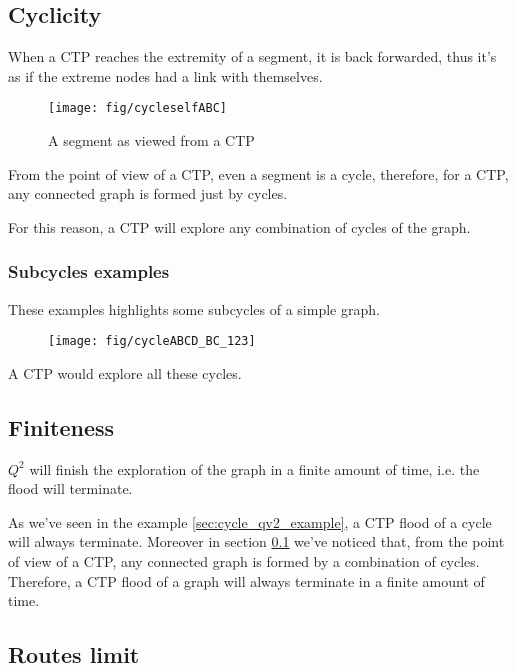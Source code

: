 \documentclass[a4paper]{article}
\begin{document}
\newpage
\subsection{Cyclicity}
\label{sec:CTP_ciclicity}
When a CTP reaches the extremity of a segment, it is back forwarded, thus it's
as if the extreme nodes had a link with themselves.

\begin{figure}[h]
	\begin{center}
		\texttt{[image: fig/cycleselfABC]}
	\end{center}
	\caption{A segment as viewed from a CTP}
	\label{fig:CTP_segment}
\end{figure}

From the point of view of a CTP, even a segment is a cycle, therefore, for a
CTP, any connected graph is formed just by cycles.

For this reason, a CTP will explore any combination of cycles of the graph.

\subsubsection{Subcycles examples}
These examples highlights some subcycles of a simple graph.

\begin{figure}[h]
	\begin{center}
		\texttt{[image: fig/cycleABCD\_BC\_123]}
	\end{center}
\end{figure}
A CTP would explore all these cycles.

\subsection{Finiteness}
$Q^2$ will finish the exploration of the graph in a finite amount of time,
i.e. the flood will terminate.

As we've seen in the example \ref{sec:cycle_qv2_example}, a CTP flood of a
cycle will always terminate. Moreover in section \ref{sec:CTP_ciclicity} we've
noticed that, from the point of view of a CTP, any connected graph is formed
by a combination of cycles. Therefore, a CTP flood of a graph will always
terminate in a finite amount of time.

\subsection{Routes limit}
\label{sec:routes_limit}
\end{document}
